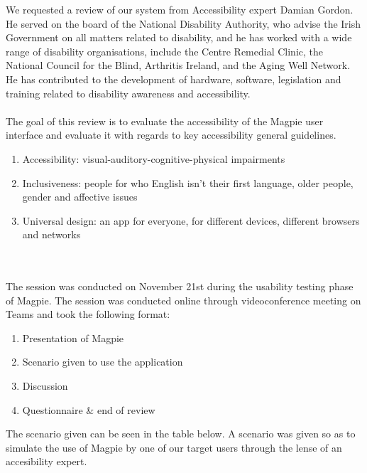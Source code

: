We requested a review of our system from Accessibility expert Damian Gordon. He served on the board of the National Disability Authority, who advise the Irish Government on all matters related to disability, and he has worked with a wide range of disability organisations, include the Centre Remedial Clinic, the National Council for the Blind, Arthritis Ireland, and the Aging Well Network. He has contributed to the development of hardware, software, legislation and training related to disability awareness and accessibility. \\\\
The goal of this review is to evaluate the accessibility of the Magpie user interface and evaluate it with regards to key accessibility general guidelines.
\begin{enumerate}
    \item Accessibility: visual-auditory-cognitive-physical impairments
    \item Inclusiveness: people for who English isn't their first language, older people, gender and affective issues
    \item Universal design: an app for everyone, for different devices, different browsers and networks
\end{enumerate}
\\\\
The session was conducted on November 21st during the usability testing phase of Magpie. The session was conducted online through videoconference meeting on Teams and took the following format:
\begin{enumerate}
    \item Presentation of Magpie
    \item Scenario given to use the application
    \item Discussion
    \item Questionnaire \& end of review
\end{enumerate}
The scenario given can be seen in the table below. A scenario was given so as to simulate the use of Magpie by one of our target users through the lense of an accesibility expert.
